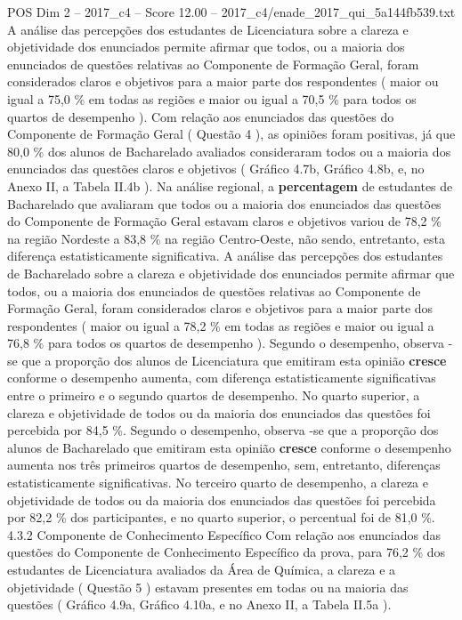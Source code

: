 \begin{textsample}{POS Dim 2 – 2017\_c4 – Score 12.00 – 2017\_c4/enade\_2017\_qui\_5a144fb539.txt}
A análise das percepções dos estudantes de Licenciatura sobre a clareza e objetividade dos enunciados permite afirmar que todos, ou a maioria dos enunciados de questões relativas ao Componente de Formação Geral, foram considerados claros e objetivos para a maior parte dos respondentes ( maior ou igual a 75,0 \% em todas as regiões e maior ou igual a 70,5 \% para todos os quartos de desempenho ).
Com relação aos enunciados das questões do Componente de Formação Geral ( Questão 4 ), as opiniões foram positivas, já que 80,0 \% dos alunos de Bacharelado avaliados consideraram todos ou a maioria dos enunciados das questões claros e objetivos ( Gráfico 4.7b, Gráfico 4.8b, e, no Anexo II, a Tabela II.4b ).
Na análise regional, a \textbf{percentagem} de estudantes de Bacharelado que avaliaram que todos ou a maioria dos enunciados das questões do Componente de Formação Geral estavam claros e objetivos variou de 78,2 \% na região Nordeste a 83,8 \% na região Centro-Oeste, não sendo, entretanto, esta diferença estatisticamente significativa.
A análise das percepções dos estudantes de Bacharelado sobre a clareza e objetividade dos enunciados permite afirmar que todos, ou a maioria dos enunciados de questões relativas ao Componente de Formação Geral, foram considerados claros e objetivos para a maior parte dos respondentes ( maior ou igual a 78,2 \% em todas as regiões e maior ou igual a 76,8 \% para todos os quartos de desempenho ).
Segundo o desempenho, observa -se que a proporção dos alunos de Licenciatura que emitiram esta opinião \textbf{cresce} conforme o desempenho aumenta, com diferença estatisticamente significativas entre o primeiro e o segundo quartos de desempenho.
No quarto superior, a clareza e objetividade de todos ou da maioria dos enunciados das questões foi percebida por 84,5 \%.
Segundo o desempenho, observa -se que a proporção dos alunos de Bacharelado que emitiram esta opinião \textbf{cresce} conforme o desempenho aumenta nos três primeiros quartos de desempenho, sem, entretanto, diferenças estatisticamente significativas.
No terceiro quarto de desempenho, a clareza e objetividade de todos ou da maioria dos enunciados das questões foi percebida por 82,2 \% dos participantes, e no quarto superior, o percentual foi de 81,0 \%. 4.3.2 Componente de Conhecimento Específico Com relação aos enunciados das questões do Componente de Conhecimento Específico da prova, para 76,2 \% dos estudantes de Licenciatura avaliados da Área de Química, a clareza e a objetividade ( Questão 5 ) estavam presentes em todas ou na maioria das questões ( Gráfico 4.9a, Gráfico 4.10a, e no Anexo II, a Tabela II.5a ).

\end{textsample}
